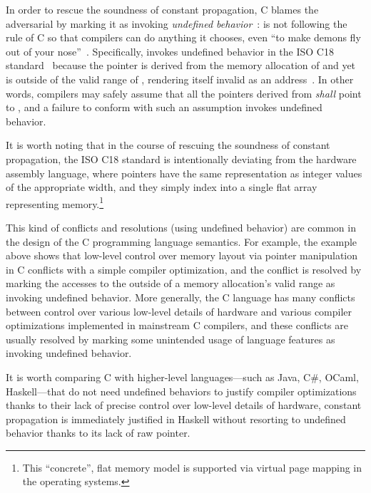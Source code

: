 In order to rescue the soundness of constant propagation, C blames the adversarial  by
marking it as invoking \emph{undefined behavior}~\cite{undefined-behavior}:  is not
following the rule of C so that compilers can do anything it chooses, \eg{} even ``to make demons
fly out of your nose''~\cite{nasal-demons}.  Specifically,  invokes undefined behavior in
the ISO C18 standard~\cite{c18} because the pointer  is derived from the memory
allocation of  and yet is outside of the valid range of , rendering itself
invalid as an address~\cite{c11-6.5.6p8}.  In other words, compilers may safely assume that all the
pointers derived from  \emph{shall} point to , and a failure to conform
with such an assumption invokes undefined behavior.

It is worth noting that in the course of rescuing the soundness of constant propagation, the ISO C18
standard is intentionally deviating from the hardware assembly language, where pointers have the
same representation as integer values of the appropriate width, and they simply index into a single
flat array representing memory.\footnote{This ``concrete'', flat memory model is supported via
  virtual page mapping in the operating systems.}


This kind of conflicts and resolutions (using undefined behavior) are common in the design of the C
programming language semantics.  For example, the example above shows that low-level control over
memory layout via pointer manipulation in C conflicts with a simple compiler optimization, and the
conflict is resolved by marking the accesses to the outside of a memory allocation's valid range as
invoking undefined behavior.  More generally, the C language has many conflicts between control over
various low-level details of hardware and various compiler optimizations implemented in mainstream C
compilers, and these conflicts are usually resolved by marking some unintended usage of language
features as invoking undefined behavior.

It is worth comparing C with higher-level languages---such as Java, C\#, OCaml, Haskell---that do
not need undefined behaviors to justify compiler optimizations thanks to their lack of precise
control over low-level details of hardware, \eg{} constant propagation is immediately justified in
Haskell without resorting to undefined behavior thanks to its lack of raw pointer.

